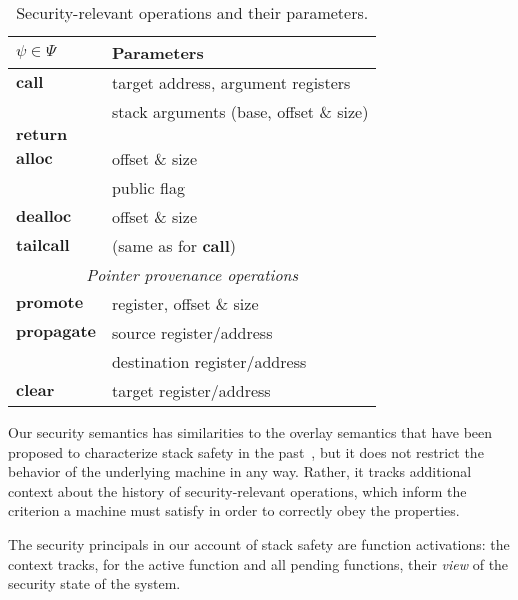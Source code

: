 \documentclass[10pt,conference]{ieeetran}%
\theoremstyle{definition}
\begin{document}
\newcommand{\example}{\rowcolor{black!0}}
\newcommand{\testing}{\rowcolor{black!10}}
\newcommand{\theory}{\rowcolor{black!25}}

\begin{table}
\begin{center}
  \begin{tabular}{| l | l |}
    \hline
    \(\psi \in \Psi\) & Parameters \\
    \hline
    \example \(\mathbf{call}\) & target address, argument registers \\
    \testing & stack arguments (base, offset \& size) \\
    \example \(\mathbf{return}\) & \\
    \example \(\mathbf{alloc}\) & offset \& size \\
    \testing & public flag \\
    \example \(\mathbf{dealloc}\) & offset \& size \\
    \testing \(\mathbf{tailcall}\) & (same as for \(\mathbf{call}\)) \\
    \hline
    \multicolumn{2}{|c|}{{\it Pointer provenance operations}} \\
    \hline
    \theory \(\mathbf{promote}\) & register, offset \& size \\
    \theory \(\mathbf{propagate}\) & source register/address \\
    \theory & destination register/address \\
    \theory \(\mathbf{clear}\) & target register/address \\
    \hline
  \end{tabular}
\end{center}
\caption{Security-relevant operations and their parameters.}
  \label{tab:psi}
\end{table}

Our security semantics has similarities to the overlay semantics that have been proposed
to characterize stack safety in the past~\cite{SkorstengaardSTK}, but it does not restrict
the behavior of the underlying machine in any way. Rather, it tracks additional context
about the history of security-relevant operations, which inform the criterion a machine
must satisfy in order to correctly obey the properties.

The security principals in our account of stack safety are function
activations: the context tracks, for the active function and all pending
functions, their {\em view} of the security state of the system.
\end{document}
